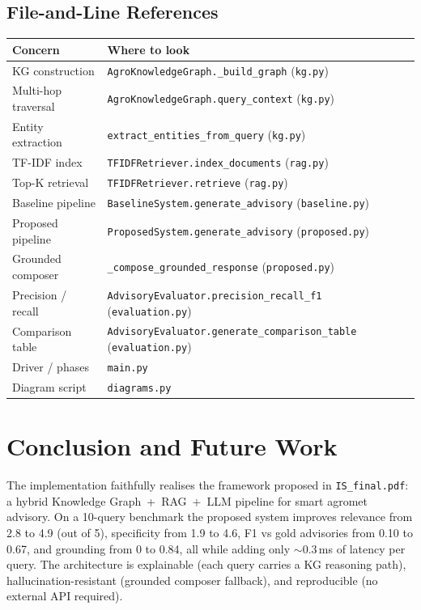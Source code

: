 \documentclass[11pt,a4paper]{article}
\begin{document}
\subsection{File-and-Line References}
\begin{center}
\small
\begin{tabular}{@{}ll@{}}
\toprule
Concern & Where to look \\
\midrule
KG construction         & \texttt{AgroKnowledgeGraph.\_build\_graph} (\texttt{kg.py}) \\
Multi-hop traversal     & \texttt{AgroKnowledgeGraph.query\_context} (\texttt{kg.py}) \\
Entity extraction       & \texttt{extract\_entities\_from\_query} (\texttt{kg.py}) \\
TF-IDF index            & \texttt{TFIDFRetriever.index\_documents} (\texttt{rag.py}) \\
Top-K retrieval         & \texttt{TFIDFRetriever.retrieve} (\texttt{rag.py}) \\
Baseline pipeline       & \texttt{BaselineSystem.generate\_advisory} (\texttt{baseline.py}) \\
Proposed pipeline       & \texttt{ProposedSystem.generate\_advisory} (\texttt{proposed.py}) \\
Grounded composer       & \texttt{\_compose\_grounded\_response} (\texttt{proposed.py}) \\
Precision / recall      & \texttt{AdvisoryEvaluator.precision\_recall\_f1} (\texttt{evaluation.py}) \\
Comparison table        & \texttt{AdvisoryEvaluator.generate\_comparison\_table} (\texttt{evaluation.py}) \\
Driver / phases         & \texttt{main.py} \\
Diagram script          & \texttt{diagrams.py} \\
\bottomrule
\end{tabular}
\end{center}

\section{Conclusion and Future Work}\label{sec:conclusion}

The implementation faithfully realises the framework proposed in
\texttt{IS\_final.pdf}: a hybrid Knowledge Graph~+~RAG~+~LLM pipeline
for smart agromet advisory. On a 10-query benchmark the proposed
system improves relevance from 2.8 to 4.9 (out of 5), specificity
from 1.9 to 4.6, F1 vs gold advisories from 0.10 to 0.67, and
grounding from 0 to 0.84, all while adding only $\sim$0.3\,ms of
latency per query. The architecture is explainable (each query
carries a KG reasoning path), hallucination-resistant (grounded
composer fallback), and reproducible (no external API required).
\end{document}

